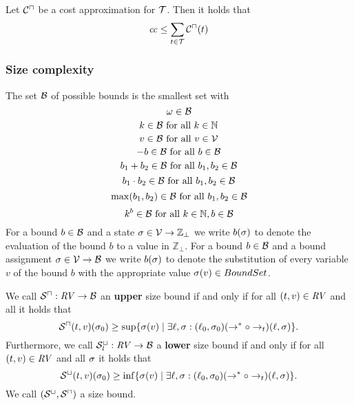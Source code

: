 \begin{theorem}
	Let ${\mathcal{C}^\sqcap}$ be a cost approximation for $\mathcal{T}$.
	Then it holds that 
	\[ \mathit{cc} \leq \sum_{t \in \mathcal{T}} {\mathcal{C}^\sqcap}(t) \]
\end{theorem}

\subsubsection{Size complexity}

\begin{definition}
	The set $\mathcal{B}$ of possible bounds is the smallest set with
	\[ \omega \in \mathcal{B} \]
	\[ k \in \mathcal{B} \text{ for all } k \in \mathbb{N} \] 
	\[ v \in \mathcal{B} \text{ for all } v \in \mathcal{V} \] 
	\[ -b \in \mathcal{B} \text{ for all } b \in \mathcal{B} \] 
	\[ b_1 + b_2 \in \mathcal{B} \text{ for all } b_1, b_2 \in \mathcal{B} \] 
	\[ b_1 \cdot b_2 \in \mathcal{B} \text{ for all } b_1, b_2 \in \mathcal{B} \] 
	\[ \max(b_1, b_2) \in \mathcal{B} \text{ for all } b_1, b_2 \in \mathcal{B} \]
	\[ k^b \in \mathcal{B} \text{ for all } k \in \mathbb{N}, b \in \mathcal{B} \]
        For a bound $b \in \mathcal{B}$ and a state $\sigma \in \mathcal{V} \rightarrow \mathbb{Z}_\bot$ we write $b(\sigma)$ to denote the evaluation of the bound $b$ to a value in $\mathbb{Z}_\bot$.
        For a bound $b \in \mathcal{B}$ and a bound assignment $\sigma \in \mathcal{V} \rightarrow \mathcal{B}$ we write $b(\sigma)$ to denote the substitution of every variable $v$ of the bound $b$ with the appropriate value $\sigma(v) \in BoundSet$.
\end{definition}

\begin{definition}
  We call ${\mathcal{S}^\sqcap}: \mathit{RV} \rightarrow \mathcal{B}$ an \textbf{upper} size bound if and only if for all $(t, v) \in \mathit{RV}$ and all  it holds that
  \[ {\mathcal{S}^\sqcap}(t, v)(\sigma_0) \geq \sup \lbrace \sigma(v) \mid \exists \ell, \sigma: (\ell_0, \sigma_0) (\rightarrow^* \circ \rightarrow_t) (\ell, \sigma) \rbrace. \]
  Furthermore, we call ${\mathcal{S}^\sqcup_l}: \mathit{RV} \rightarrow \mathcal{B}$ a \textbf{lower} size bound if and only if for all $(t, v) \in \mathit{RV}$ and all $\sigma$ it holds that
  \[ {\mathcal{S}^\sqcup}(t, v)(\sigma_0) \geq \inf \lbrace \sigma(v) \mid \exists \ell, \sigma: (\ell_0, \sigma_0) (\rightarrow^* \circ \rightarrow_t) (\ell, \sigma) \rbrace. \]
  We call ${({\mathcal{S}^\sqcup}, {\mathcal{S}^\sqcap})}$ a size bound.
\end{definition}

